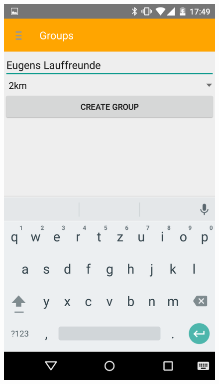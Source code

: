 \begin{figure}[!h]
\centering
\begin{minipage}{.4\textwidth}
  \centering
  \includegraphics[width=.8\linewidth]{abb/bsp/bsp3}
  \label{fig:bsp3}
\end{minipage}
\begin{minipage}{.4\textwidth}
  \centering

\end{minipage}
\end{figure}
